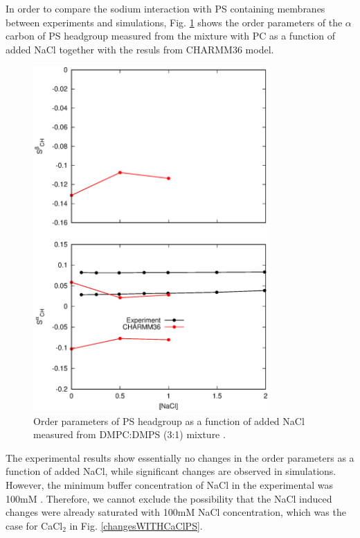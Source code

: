 \documentclass[aps,prl,superscriptaddress,twocolumn]{revtex4}
\begin{document}
In order to compare the sodium interaction with PS containing membranes between
experiments and simulations, Fig. \ref{PSresponseTONaCl} shows the order parameters of the
$\alpha$ carbon of PS headgroup measured from the mixture with PC as a
function of added NaCl \cite{roux86} together with the resuls from CHARMM36 model. 
\begin{figure}[]
  \centering
  \includegraphics[width=9.0cm]{../Figs/PSresponseTONaCl.eps}
  \caption{\label{PSresponseTONaCl}
    Order parameters of PS headgroup as a function of added NaCl measured from DMPC:DMPS (3:1) mixture \cite{roux86}.
  }
\end{figure}
The experimental results show essentially no changes in the order parameters as a function of
added NaCl, while significant changes are observed in simulations. However,
the minimum buffer concentration of NaCl in the experimental was 100mM \cite{roux86}.
Therefore, we cannot exclude the possibility that the NaCl induced changes were already
saturated with 100mM NaCl concentration, which was the case for CaCl$_2$ in Fig. \ref{changesWITHCaClPS}.
\end{document}
